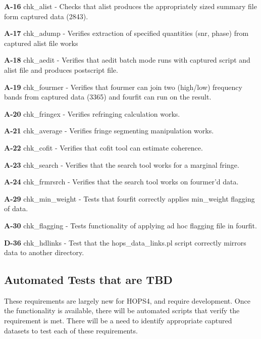 \begin{description}

\item{\textbf{A-16}} chk\_alist - Checks that alist produces the appropriately sized summary file form captured data (2843).
\item{\textbf{A-17}} chk\_adump - Verifies extraction of specified quantities (snr, phase) from captured alist file works
\item{\textbf{A-18}} chk\_aedit - Verifies that aedit batch mode runs with captured script and alist file and produces postscript file.
\item{\textbf{A-19}} chk\_fourmer - Verifies that fourmer can join two (high/low) frequency bands from captured data (3365) and fourfit can run on the result.
\item{\textbf{A-20}} chk\_fringex -  Verifies refringing calculation works.
\item{\textbf{A-21}} chk\_average - Verifies fringe segmenting manipulation works.
\item{\textbf{A-22}} chk\_cofit - Verifies that cofit tool can estimate coherence.
\item{\textbf{A-23}} chk\_search - Verifies that the search tool works for a marginal fringe.
\item{\textbf{A-24}} chk\_frmrsrch -  Verifies that the search tool works on fourmer'd data.
\item{\textbf{A-29}} chk\_min\_weight - Tests that fourfit correctly applies min\_weight flagging of data.
\item{\textbf{A-30}} chk\_flagging - Tests functionality of applying ad hoc flagging file in fourfit.
\item{\textbf{D-36}} chk\_hdlinks - Test that the hops\_data\_links.pl script correctly mirrors data to another directory.
\end{description}
  


\subsection{Automated Tests that are TBD}
\label{sec:regress3}

These requirements are largely new for HOPS4, and require development. Once the functionality is available, there will be automated scripts that verify the requirement is met.
There will be a need to identify appropriate captured datasets to test each of these requirements.

